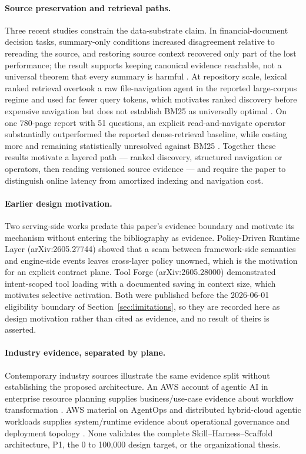 \documentclass[11pt]{article}
\begin{document}
\paragraph{Source preservation and retrieval paths.}
Three recent studies constrain the data-substrate claim. In financial-document decision tasks, summary-only conditions increased disagreement relative to rereading the source, and restoring source context recovered only part of the lost performance; the result supports keeping canonical evidence reachable, not a universal theorem that every summary is harmful \cite{lee2026summaries}. At repository scale, lexical ranked retrieval overtook a raw file-navigation agent in the reported large-corpus regime and used far fewer query tokens, which motivates ranked discovery before expensive navigation but does not establish BM25 as universally optimal \cite{wang2026bm25scale}. On one 780-page report with 51 questions, an explicit read-and-navigate operator substantially outperformed the reported dense-retrieval baseline, while costing more and remaining statistically unresolved against BM25 \cite{tamang2026beyondtopk}. Together these results motivate a layered path --- ranked discovery, structured navigation or operators, then reading versioned source evidence --- and require the paper to distinguish online latency from amortized indexing and navigation cost.

\paragraph{Earlier design motivation.}
Two serving-side works predate this paper's evidence boundary and motivate its mechanism without entering the bibliography as evidence. Policy-Driven Runtime Layer (arXiv:2605.27744) showed that a seam between framework-side semantics and engine-side events leaves cross-layer policy unowned, which is the motivation for an explicit contract plane. Tool Forge (arXiv:2605.28000) demonstrated intent-scoped tool loading with a documented saving in context size, which motivates selective activation. Both were published before the 2026-06-01 eligibility boundary of Section~\ref{sec:limitations}, so they are recorded here as design motivation rather than cited as evidence, and no result of theirs is asserted.

\paragraph{Industry evidence, separated by plane.}
Contemporary industry sources illustrate the same evidence split without establishing the proposed architecture. An AWS account of agentic AI in enterprise resource planning supplies business/use-case evidence about workflow transformation \cite{aws2026erp}. AWS material on AgentOps and distributed hybrid-cloud agentic workloads supplies system/runtime evidence about operational governance and deployment topology \cite{aws2026agentops,aws2026hybrid}. None validates the complete Skill--Harness--Scaffold architecture, P1, the 0 to 100{,}000 design target, or the organizational thesis.
\end{document}
